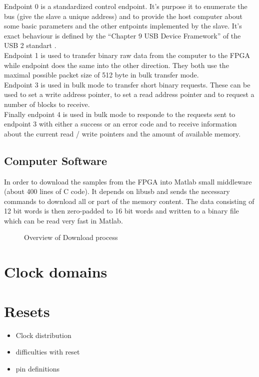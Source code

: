 Endpoint 0 is a standardized control endpoint. It's purpose it to
enumerate the bus (give the slave a unique address) and to provide the
host computer about some basic parameters and the other entpoints
implemented by the slave. It's exact behaviour is defined by the
``Chapter 9 USB Device Framework'' of the USB 2 standart . \\

Endpoint 1 is used to transfer binary raw data from the computer to the \gls{FPGA}
while endpoint does the same into the other direction. They both use the maximal
possible packet size of 512 byte in bulk transfer mode. \\

Endpoint 3 is used in bulk mode to transfer short binary requests.
These can be used to set a write address pointer, to set a read address pointer
and to request a number of blocks to receive. \\

Finally endpoint 4 is used in bulk mode to responde to the requests sent
to endpoint 3 with either a success or an error code and to receive information
about the current read / write pointers and the amount of available memory. \\

\subsection{Computer Software}
In order to download the samples from the \gls{FPGA} into Matlab small 
middleware (about 400 lines of C code). It depends on libusb 
and sends the necessary commands to download all or part of the memory content.
The data consisting of 12 bit words is then zero-padded to 16 bit words
and written to a binary file which can be read very fast in Matlab.

\begin{figure}[ht]
  \centering
  \caption{Overview of Download process}
  \label{fig:fpga_architecture_overview}
\end{figure}

\section{Clock domains}
\label{sec:fpga_clocks}


\section{Resets}

\begin{itemize}
\item Clock distribution
\item difficulties with reset
\item pin definitions
\end{itemize}
